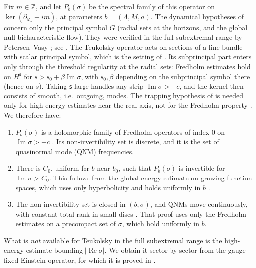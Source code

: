\documentclass[11pt]{amsart}
\theoremstyle{definition}
\theoremstyle{remark}
\numberwithin{equation}{section}
\newcommand{\Z}{\mathbb{Z}}
\renewcommand{\Im}{\operatorname{Im}}
\renewcommand{\Re}{\operatorname{Re}}
\begin{document}
Fix $m\in\Z$, and let $P_b(\sigma)$ be the spectral family of this operator on $\ker(\partial_{\varphi_*}-im)$, at
parameters $b=(\Lambda,M,a)$. The dynamical hypotheses of \cite[\S5.1]{HV18} concern only the principal symbol $G$
(radial sets at the horizons, and the global null-bicharacteristic flow). They were verified in the full
subextremal range by Petersen--Vasy \cite{PV25,PV24}; see \cite[Remark~2.12]{HPV25}. The Teukolsky operator acts on sections of a line bundle with scalar principal
symbol, which is the setting of \cite{Vas13,HV18}. Its subprincipal part enters only through the threshold regularity
at the radial sets: Fredholm estimates hold on $H^{\mathsf s}$ for $\mathsf s>\mathsf s_0+\beta\Im\sigma$, with $\mathsf s_0,\beta$
depending on the subprincipal symbol there (hence on $s$). Taking $\mathsf s$ large handles any strip $\Im\sigma>-c$, and
the kernel then consists of smooth, i.e.\ outgoing, modes. The trapping hypothesis of \cite[\S5.1]{HV18} is needed
only for high-energy estimates near the real axis, not for the Fredholm property \cite[Theorem~5.4 and the remark
in its proof]{HV18}. We therefore have:
\begin{enumerate}[label=(F\arabic*)]
\item $P_b(\sigma)$ is a holomorphic family of Fredholm operators of index $0$ on $\Im\sigma>-c$
\cite[Theorem~5.4]{HV18}. Its non-invertibility set is discrete, and it is the set of quasinormal mode (QNM)
frequencies.
\item There is $C_0$, uniform for $b$ near $b_0$, such that $P_b(\sigma)$ is invertible for $\Im\sigma>C_0$. This
follows from the global energy estimate on growing function spaces, which uses only hyperbolicity and holds
uniformly in $b$ \cite[\S5.1.2]{HV18}.
\item The non-invertibility set is closed in $(b,\sigma)$, and QNMs move continuously, with constant total rank in
small discs \cite[Proposition~5.11]{HV18}. That proof uses only the Fredholm estimates \cite[(5.26)]{HV18} on a
precompact set of $\sigma$, which hold uniformly in $b$.
\end{enumerate}
What is \emph{not} available for Teukolsky in the full subextremal range is the high-energy estimate bounding
$|\Re\sigma|$. We obtain it sector by sector from the gauge-fixed Einstein operator, for which it is proved in
\cite{HPV25}.
\end{document}
